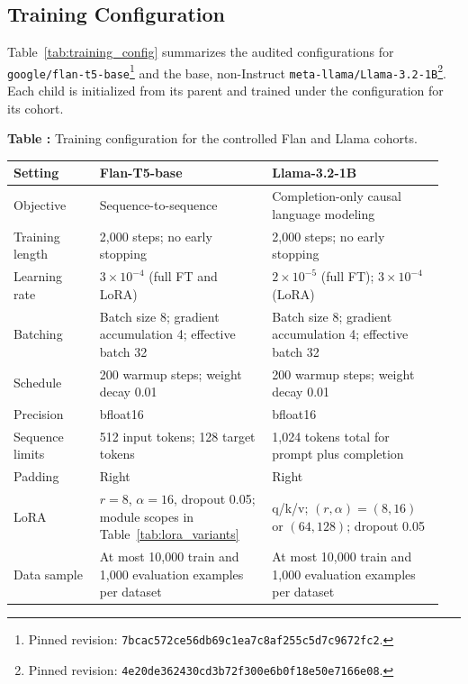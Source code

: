 \documentclass{article}
\theoremstyle{definition}
\theoremstyle{plain}
\begin{document}
\subsection*{Training Configuration}
Table~\ref{tab:training_config} summarizes the audited configurations for
\texttt{google/flan-t5-base}\footnote{Pinned revision:
\nolinkurl{7bcac572ce56db69c1ea7c8af255c5d7c9672fc2}.} and the base, non-Instruct
\texttt{meta-llama/Llama-3.2-1B}\footnote{Pinned revision:
\nolinkurl{4e20de362430cd3b72f300e6b0f18e50e7166e08}.}. Each child is initialized
from its parent and trained under the configuration for its cohort.

\begin{center}
\begin{minipage}{\linewidth}
\centering
{}
\label{tab:training_config}
\textbf{Table \thetable:} Training configuration for the controlled Flan and Llama cohorts.
\vspace{4pt}

\small
\setlength{\tabcolsep}{4pt}
\begin{tabular}{@{}p{0.19\linewidth}p{0.38\linewidth}p{0.38\linewidth}@{}}
\toprule
Setting & Flan-T5-base & Llama-3.2-1B \\
\midrule
Objective & Sequence-to-sequence & Completion-only causal language modeling \\
Training length & 2,000 steps; no early stopping & 2,000 steps; no early stopping \\
Learning rate & $3\times10^{-4}$ (full FT and LoRA) & $2\times10^{-5}$ (full FT); $3\times10^{-4}$ (LoRA) \\
Batching & Batch size 8; gradient accumulation 4; effective batch 32 & Batch size 8; gradient accumulation 4; effective batch 32 \\
Schedule & 200 warmup steps; weight decay 0.01 & 200 warmup steps; weight decay 0.01 \\
Precision & bfloat16 & bfloat16 \\
Sequence limits & 512 input tokens; 128 target tokens & 1,024 tokens total for prompt plus completion \\
Padding & Right & Right \\
LoRA & $r=8$, $\alpha=16$, dropout 0.05; module scopes in Table~\ref{tab:lora_variants} & q/k/v; $(r,\alpha)=(8,16)$ or $(64,128)$; dropout 0.05 \\
Data sample & At most 10,000 train and 1,000 evaluation examples per dataset & At most 10,000 train and 1,000 evaluation examples per dataset \\
\bottomrule
\end{tabular}
\end{minipage}
\end{center}
\end{document}
